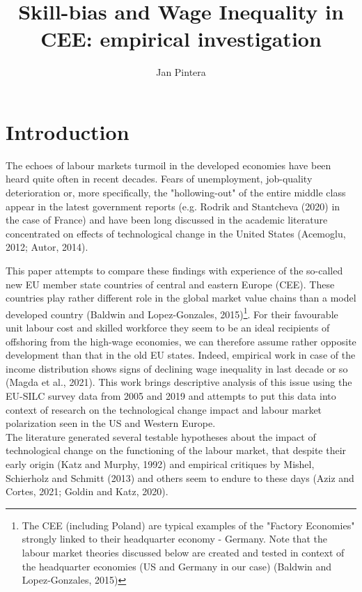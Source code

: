 \documentclass{article}
\title{Skill-bias and Wage Inequality in CEE: empirical investigation}
\author{Jan Pintera}
\date{}
\begin{document}
\maketitle
\section{Introduction}
The echoes of labour markets turmoil in the developed economies have been heard quite often in recent decades. Fears of unemployment, job-quality deterioration or, more specifically, the "hollowing-out" of the entire middle class appear in the latest government reports (e.g. Rodrik and Stantcheva (2020) in the case of France) and have been long discussed in the academic literature concentrated on effects of technological change in the United States (Acemoglu, 2012; Autor, 2014).

This paper attempts to compare these findings with experience of the so-called new EU member state countries of central and eastern Europe (CEE). These countries play rather different role in the global market value chains than a model developed country (Baldwin and Lopez-Gonzales, 2015)\footnote{The CEE (including Poland) are typical examples of the "Factory Economies" strongly linked to their headquarter economy - Germany. Note that the labour market theories discussed below are created and tested in context of the headquarter economies (US and Germany in our case) (Baldwin and Lopez-Gonzales, 2015)}. For their favourable unit labour cost and skilled workforce they seem to be an ideal recipients of offshoring from the high-wage economies, we can therefore assume rather opposite development than that in the old EU states. Indeed, empirical work in case of the income distribution shows signs of declining wage inequality in last decade or so (Magda et al., 2021). This work brings descriptive analysis of this issue using the EU-SILC survey data from 2005 and 2019 and attempts to put this data into context of research on the technological change impact and labour market polarization seen in the US and Western Europe.
\\
The literature generated several testable hypotheses about the impact of technological change on the functioning of the labour market, that despite their early origin (Katz and Murphy, 1992) and empirical critiques by Mishel, Schierholz and Schmitt (2013) and others seem to endure to these days (Aziz and Cortes, 2021; Goldin and Katz, 2020).
\end{document}
